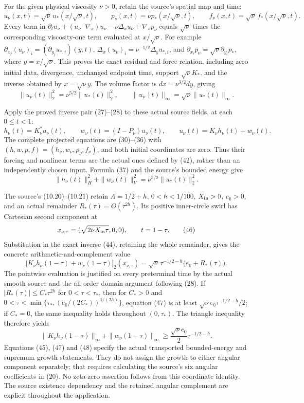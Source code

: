 For the given physical viscosity \(\nu>0\), retain the source's spatial map and time: \[
u_\nu(x,t)=\sqrt\nu\,u_*(x/\sqrt\nu,t),\qquad
p_\nu(x,t)=\nu p_*(x/\sqrt\nu,t),\qquad
f_\nu(x,t)=\sqrt\nu\,f_*(x/\sqrt\nu,t).
\tag{42}
\] Every term in \(\partial_tu_\nu+(u_\nu\cdot\nabla_x)u_\nu-\nu\Delta_xu_\nu+\nabla_xp_\nu\) equals \(\sqrt\nu\) times the corresponding viscosity-one term evaluated at \(x/\sqrt\nu\). For example \(\partial_{x_j}(u_\nu)_i=(\partial_{y_j}u_{*,i})(y,t)\), \(\Delta_x(u_\nu)_i=\nu^{-1/2}\Delta_yu_{*,i}\), and \(\partial_{x_i}p_\nu=\sqrt\nu\partial_{y_i}p_*\), where \(y=x/\sqrt\nu\). This proves the exact residual and force relation, including zero initial data, divergence, unchanged endpoint time, support \(\sqrt\nu K_*\), and the inverse obtained by \(x=\sqrt\nu y\). The volume factor is \(dx=\nu^{3/2}dy\), giving \[
\|u_\nu(t)\|_2^2=\nu^{5/2}\|u_*(t)\|_2^2,
\qquad \|u_\nu(t)\|_\infty=\sqrt\nu\|u_*(t)\|_\infty.
\tag{43}
\]

Apply the proved inverse pair (27)--(28) to these actual source fields, at each \(0\le t<1\): \[
h_\nu(t)=K_\nu^*u_\nu(t),\qquad
w_\nu(t)=(I-P_\nu)u_\nu(t),\qquad
u_\nu(t)=K_\nu h_\nu(t)+w_\nu(t).
\tag{44}
\] The complete projected equations are (30)--(36) with \((h,w,p,f)=(h_\nu,w_\nu,p_\nu,f_\nu)\), and both initial coordinates are zero. Thus their forcing and nonlinear terms are the actual ones defined by (42), rather than an independently chosen input. Formula (37) and the source's bounded energy give \[
\|h_\nu(t)\|_H^2+\|w_\nu(t)\|_V^2
=\nu^{5/2}\|u_*(t)\|_2^2.
\tag{45}
\]

The source's (10.20)--(10.21) retain \(A=1/2+h\), \(0<h<1/100\), \(X_{\rm in}>0\), \(e_0>0\), and an actual remainder \(R_*(\tau)=O(\tau^{2h})\). Its positive inner-circle swirl has Cartesian second component at \[
x_{\nu,\tau}=(\sqrt{2\nu X_{\rm in}\tau},0,0),\qquad t=1-\tau.
\tag{46}
\] Substitution in the exact inverse (44), retaining the whole remainder, gives the concrete arithmetic-and-complement value \[
\big[K_\nu h_\nu(1-\tau)+w_\nu(1-\tau)\big]_2(x_{\nu,\tau})
=\sqrt\nu\,\tau^{-1/2-h}\big(e_0+R_*(\tau)\big).
\tag{47}
\] The pointwise evaluation is justified on every preterminal time by the actual smooth source and the all-order domain argument following (28). If \(|R_*(\tau)|\le C_*\tau^{2h}\) for \(0<\tau<\tau_*\), then for \(C_*>0\) and \(0<\tau<\min\{\tau_*,(e_0/(2C_*))^{1/(2h)}\}\), equation (47) is at least \(\sqrt\nu e_0\tau^{-1/2-h}/2\); if \(C_*=0\), the same inequality holds throughout \((0,\tau_*)\). The triangle inequality therefore yields \[
\|K_\nu h_\nu(1-\tau)\|_\infty+\|w_\nu(1-\tau)\|_\infty
\ge \frac{\sqrt\nu e_0}{2}\tau^{-1/2-h}.
\tag{48}
\] Equations (45), (47) and (48) specify the actual transported bounded-energy and supremum-growth statements. They do not assign the growth to either angular component separately; that requires calculating the source's six angular coefficients in (20). No zeta-zero assertion follows from this coordinate identity. The source existence dependency and the retained angular complement are explicit throughout the application.

